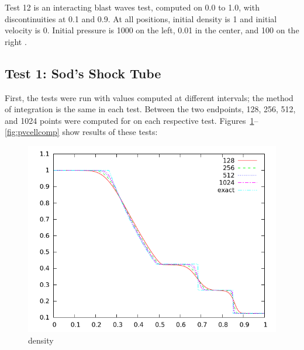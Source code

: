 \documentclass[10pt,preprint]{aastex}
\begin{document}
Test 12 is an interacting blast waves test, computed on 0.0 to 1.0, with discontinuities at 0.1 and 0.9. At all positions, initial density is 1 and initial velocity is 0. Initial pressure is 1000 on the left, 0.01 in the center, and 100 on the right \citep{LiskaWendroff2003}.
\subsection{Test 1: Sod's Shock Tube} 

First, the tests were run with values computed at different intervals; the method of integration is the same in each test. Between the two endpoints, 128, 256, 512, and 1024 points were computed for on each respective test. Figures~\ref{fig:dencellcomp_20}--\ref{fig:pvcellcomp} show results of these tests:
\begin{figure}[h!]
  \begin{center}
    \includegraphics[width=.95\textwidth]{dencellcomp_20}
  \end{center}
  \caption{density}
  \label{fig:dencellcomp_20}
\end{figure}
\end{document}
